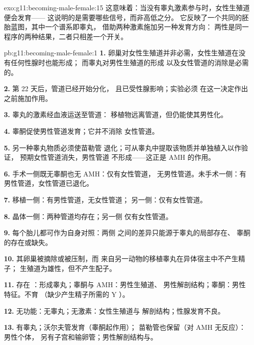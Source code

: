 \begin{solution}{exo:g11:becoming-male-female:15}
这意味着：当没有睾丸激素参与时，女性生殖道便会发育——
这说明的是需要哪些信号，而非高低之分。
它反映了一个共同的胚胎蓝图，其中一个谱系即睾丸，
借助两种激素施加另一种发育方向：
两性是同一程序的两种结果，二者只相差一个开关。
\end{solution}

\begin{solution}{pb:g11:becoming-male-female:1}
\textbf{1.} 卵巢对女性生殖道并非必需，女性生殖道在没有任何性腺时也能形成；
而睾丸对男性生殖道的形成
以及女性管道的消除是必需的。

\textbf{2.} 第 22 天后，管道已经开始分化，
且已受性腺影响；实验必须
在这一决定作出之前施加作用。

\textbf{3.} 睾丸的激素经血液运送至管道：
移植物远离管道，但仍能使其男性化。

\textbf{4.} 睾酮促使男性管道发育；它并不消除
女性管道。

\textbf{5.} 另一种睾丸物质必须使苗勒管
退化；可从睾丸中提取该物质并单独植入以作验证，
预期女性管道消失，男性管道
不形成——这正是 AMH 的作用。

\textbf{6.} 手术一侧既无睾酮也无 AMH：仅有女性管道，
无男性管道。未手术一侧：有男性管道，女性管道已退化。

\textbf{7.} 移植一侧：有男性管道，无女性管道；
另一侧：仅有女性管道。

\textbf{8.} 晶体一侧：两种管道均存在；另一侧
仅有女性管道。

\textbf{9.} 每个胎儿都可作为自身对照：两侧
之间的差异只能源于睾丸的局部存在、
睾酮的存在或缺失。

\textbf{10.} 其卵巢被摘除或被压制，而
来自另一动物的移植睾丸在异体宿主中不产生精子；
生殖道为雄性，但不产生配子。

\textbf{11.} 存在 ：形成睾丸；睾酮与 AMH：男性生殖道、
男性解剖结构；睾酮：男性特征。不育
（缺少产生精子所需的 Y ）。

\textbf{12.}  无功能：无睾丸；无激素：女性生殖道与
解剖结构；性腺发育不良。

\textbf{13.} 有睾丸；沃尔夫管发育（睾酮起作用）；
苗勒管也保留（对 AMH 无反应）：男性个体，
另有子宫和输卵管；男性解剖结构与。


\end{solution}
